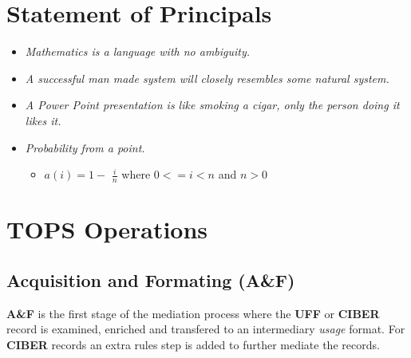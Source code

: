 \documentclass[12pt,twoside]{article}
\begin{document}
\addtolength{\oddsidemargin}{0in}
\addtolength{\evensidemargin}{-01.25in}
\addtolength{\textwidth}{1.4in}
\addtolength{\topmargin}{-1.25in}
\addtolength{\textheight}{2.45in}
\setcounter{tocdepth}{3}
\vspace*{1cm} 
\setcounter{tocdepth}{2}
\pagestyle{fancy}
\fancyhf[C]{}
\setcounter{tocdepth}{2}
\tableofcontents
\newpage
{}
\section{Statement of Principals}
\label{sec:orgheadline1}
\begin{itemize}
\item \emph{Mathematics is a language with no ambiguity.}
\item \emph{A successful man made system will closely resembles some natural system.}
\item \emph{A Power Point presentation is like smoking a cigar, only the
person doing it likes it.}
\item \emph{Probability from a point.}
\begin{itemize}
\item \(a(i) = 1-\) \Large \(\frac{i}{n}\) \normalsize where \(0 <= i < n\) and \(n > 0\)
\end{itemize}
\end{itemize}
\section{TOPS Operations}
\label{sec:orgheadline20}
\subsection{Acquisition and Formating (A\&F)}
\label{sec:orgheadline2}
\textbf{A\&F} is the first stage of the mediation process where the \textbf{UFF} or \textbf{CIBER} record is examined, enriched 
and transfered to an intermediary \emph{usage} format. For \textbf{CIBER} records an extra rules step is 
added to further mediate the records.
\end{document}

